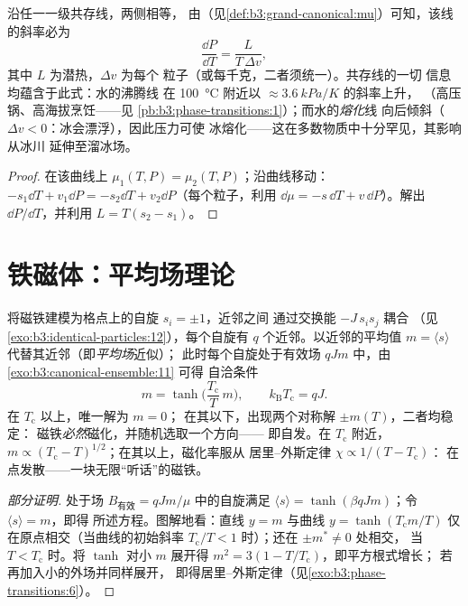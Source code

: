 \begin{proposition}\label{prop:b3:phase-transitions:clapeyron}
沿任一一级共存线，两侧相等，
由（见\cref{def:b3:grand-canonical:mu}）可知，该线的斜率必为
\[
\frac{\dd P}{\dd T} = \frac{L}{T\,\Delta v} ,
\]
其中 $L$ 为潜热，$\Delta v$ 为每个
粒子（或每千克，二者须统一）。共存线的一切
信息均蕴含于此式：水的沸腾线
在 \qty{100}{\celsius} 附近以 $\approx\qty{3.6}{kPa/K}$ 的斜率上升，
（高压锅、高海拔烹饪——见
\cref{pb:b3:phase-transitions:1}）；而水的\emph{熔化}线
向后倾斜（$\Delta v < 0$：冰会漂浮），因此压力可使
冰熔化——这在多数物质中十分罕见，其影响从冰川
延伸至溜冰场。
\end{proposition}

\begin{proof}
在该曲线上 $\mu_1(T, P) = \mu_2(T, P)$；沿曲线移动：
$-s_1\dd T + v_1\dd P = -s_2\dd T + v_2\dd P$（每个粒子，利用
$\dd\mu = -s\,\dd T + v\,\dd P$）。解出 $\dd P/\dd T$，并利用
$L = T(s_2 - s_1)$。
\end{proof}

\section{铁磁体：平均场理论}

\begin{theorem}[平均场伊辛相变]\label{thm:b3:phase-transitions:meanfield}
将磁铁建模为格点上的自旋 $s_i = \pm1$，近邻之间
通过交换能 $-J\,s_is_j$ 耦合
（见\cref{exo:b3:identical-particles:12}），每个自旋有 $q$
个近邻。以近邻的平均值 $m =
\langle s\rangle$ 代替其近邻（即\emph{平均场}近似）；
此时每个自旋处于有效场 $qJm$ 中，由
\cref{exo:b3:canonical-ensemble:11} 可得
自洽条件
\[
m = \tanh\!\Big(\frac{T_{\text{c}}}{T}\,m\Big) , \qquad
k_{\text{B}}T_{\text{c}} = qJ .
\]
在 $T_{\text{c}}$ 以上，唯一解为 $m = 0$；
在其以下，出现两个对称解 $\pm m(T)$，二者均稳定：
磁铁\emph{必然}磁化，并随机选取一个方向——
即自发。在 $T_{\text{c}}$ 附近，$m \propto
(T_{\text{c}} - T)^{1/2}$；在其以上，磁化率服从
居里–外斯定律 $\chi \propto 1/(T - T_{\text{c}})$：
在点发散——一块无限“听话”的磁铁。
\end{theorem}

\begin{proof}[部分证明]
处于场 $B_{\text{有效}} = qJm/\mu$ 中的自旋满足 $\langle s\rangle =
\tanh(\beta qJm)$；令 $\langle s\rangle = m$，即得
所述方程。图解地看：直线 $y = m$ 与曲线 $y =
\tanh(T_{\text{c}}m/T)$ 仅在原点相交（当曲线的初始斜率
$T_{\text{c}}/T < 1$ 时）；还在 $\pm m^* \neq 0$ 处相交，
当 $T < T_{\text{c}}$ 时。将 $\tanh$ 对小
$m$ 展开得 $m^2 = 3(1 - T/T_{\text{c}})$，即平方根式增长；
若再加入小的外场并同样展开，
即得居里–外斯定律（见\cref{exo:b3:phase-transitions:6}）。
\end{proof}

